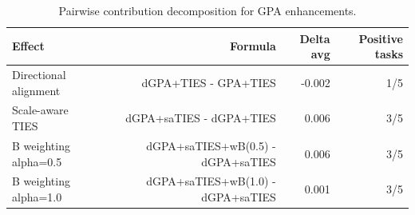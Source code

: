 \begin{table}[htbp]
\centering
\caption{Pairwise contribution decomposition for GPA enhancements.}
\label{tab:enhancement-contributions}
\begin{tabular}{lrrr}
\toprule
Effect & Formula & Delta avg & Positive tasks \\
\midrule
Directional alignment & dGPA+TIES - GPA+TIES & -0.002 & 1/5 \\
Scale-aware TIES & dGPA+saTIES - dGPA+TIES & 0.006 & 3/5 \\
B weighting alpha=0.5 & dGPA+saTIES+wB(0.5) - dGPA+saTIES & 0.006 & 3/5 \\
B weighting alpha=1.0 & dGPA+saTIES+wB(1.0) - dGPA+saTIES & 0.001 & 3/5 \\
\bottomrule
\end{tabular}
\end{table}
